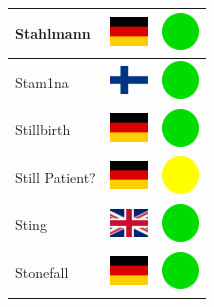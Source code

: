 \documentclass[12pt, a4paper, twoside]{report}
\begin{document}
\begin{center}
\begin{longtable}{|p{5cm}|p{2cm}|p{2cm}|}
Stahlmann & \includegraphics[width=1cm]{4x3/de} & \includegraphics[width=1cm]{likes/y} \\ \hline
Stam1na & \includegraphics[width=1cm]{4x3/fi} & \includegraphics[width=1cm]{likes/y} \\ \hline
Stillbirth & \includegraphics[width=1cm]{4x3/de} & \includegraphics[width=1cm]{likes/y} \\ \hline
Still Patient? & \includegraphics[width=1cm]{4x3/de} & \includegraphics[width=1cm]{likes/m} \\ \hline
Sting & \includegraphics[width=1cm]{4x3/gb} & \includegraphics[width=1cm]{likes/y} \\ \hline
Stonefall & \includegraphics[width=1cm]{4x3/de} & \includegraphics[width=1cm]{likes/y} \\ \hline

\end{longtable}
\end{center}
\end{document}
